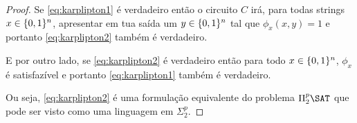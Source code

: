 \begin{proof}
Se \ref{eq:karplipton1} é verdadeiro então o circuito $C$ irá, para todas strings $x \in \{0, 1\}^{n}$, apresentar em tua saída um $y \in \{0, 1\}^{n}$ tal que $\phi_{x}(x, y) = 1$ e portanto \ref{eq:karplipton2} também é verdadeiro.

E por outro lado, se \ref{eq:karplipton2} é verdadeiro então para todo $x \in \{0, 1\}^{n}$, $\phi_{x}$ é satisfazível e portanto \ref{eq:karplipton1} também é verdadeiro.

Ou seja, \ref{eq:karplipton2} é uma formulação equivalente do problema $\Pi_{2}^{p}\SAT$ que pode ser visto como uma linguagem em $\Sigma_{2}^{p}$.








\end{proof}

